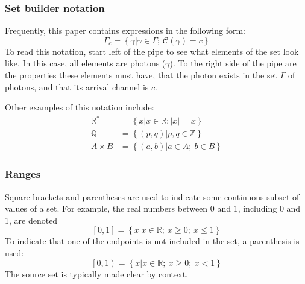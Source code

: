 \documentclass{article}
\newcommand{\braces}[1]{\ensuremath{\left\lbrace #1 \right\rbrace}}
\newcommand{\brackets}[1]{\ensuremath{\left[ #1 \right]}}
\newcommand{\setbuilder}[2]{\ensuremath{\braces{#1 \left| #2 \right.}}}
\newcommand{\integers}{\ensuremath{\mathbb{Z}}}
\newcommand{\reals}{\ensuremath{\mathbb{R}}}
\newcommand{\rationals}{\ensuremath{\mathbb{Q}}}
\newcommand{\abs}[1]{\ensuremath{\left|#1\right|}}
\newcommand{\channel}{\ensuremath{c}}
\newcommand{\Channel}{\ensuremath{\mathcal{C}}}
\newcommand{\photon}{\ensuremath{\gamma}}
\newcommand{\photons}{\ensuremath{\Gamma}}
\begin{document}
\begin{appendix}
\subsubsection{Set builder notation}
Frequently, this paper contains expressions in the following form:
\begin{equation}
\photons_{\channel}=\braces{\photon\left|\photon\in\photons;~\Channel(\photon)=\channel\right.}
\end{equation}
To read this notation, start left of the pipe to see what elements of the set look like. In this case, all elements are photons (\photon). To the right side of the pipe are the properties these elements must have, that the photon exists in the set \photons{} of photons, and that its arrival channel is $c$. 

Other examples of this notation include:
\begin{align}
\reals^{*} &= \setbuilder{x}
                        {x\in\reals; \abs{x}=x} \\
\rationals &= \setbuilder{(p,q)}
                        {p,q\in\integers} \\
A\times B &= \setbuilder{(a,b)}
                       {a\in A;~b\in B}                       
\end{align}

\subsubsection{Ranges}
Square brackets and parentheses are used to indicate some continuous subset of values of a set. For example, the real numbers between 0 and 1, including 0 and 1, are denoted
\begin{equation}
\brackets{0,1} = \setbuilder{x}{x\in\reals;~x\ge 0;~x\le 1}
\end{equation}
To indicate that one of the endpoints is not included in the set, a parenthesis is used:
\begin{equation}
\left[0,1\right) = \setbuilder{x}{x\in\reals;~x\ge 0;~x<1}
\end{equation}
The source set is typically made clear by context.


\end{appendix}
\end{document}
